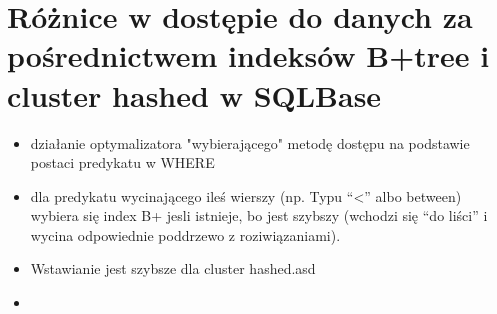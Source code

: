 \documentclass[a4paper,twoside]{article}
\begin{document}
  \section*{Różnice w dostępie do danych za pośrednictwem indeksów B+tree i cluster hashed w SQLBase}
      \begin{itemize}
      \item działanie optymalizatora "wybierającego" metodę dostępu na podstawie postaci predykatu w WHERE
      \item dla predykatu wycinającego ileś wierszy (np. Typu “<” albo between) wybiera się index B+ jesli istnieje, bo jest szybszy (wchodzi się “do liści” i wycina odpowiednie poddrzewo z roziwiązaniami).
      \item Wstawianie jest szybsze dla cluster hashed.asd
      \item 
      \end{itemize}


  
\end{document}
